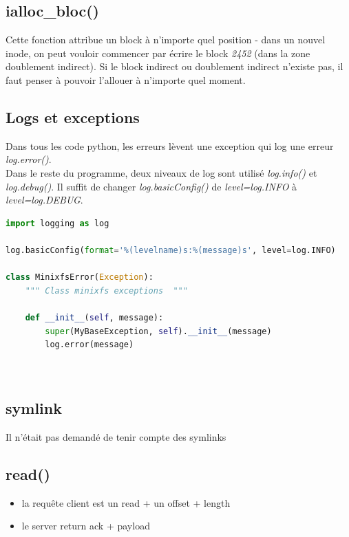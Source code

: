 \documentclass[a4paper,12pt]{article}
\begin{document}
\subsection{ialloc\_bloc()}

Cette fonction attribue un block à n'importe quel position - dans un nouvel inode, on peut vouloir commencer par écrire le block \emph{2452} (dans la zone doublement indirect). Si le block indirect ou doublement indirect n'existe pas, il faut penser à pouvoir l'allouer à n'importe quel moment.\\

\subsection{Logs et exceptions}

Dans tous les code python, les erreurs lèvent une exception qui log une erreur \emph{log.error()}.\\

Dans le reste du programme, deux niveaux de log sont utilisé \emph{log.info()} et \emph{log.debug()}. Il suffit de changer \emph{log.basicConfig()} de \emph{level=log.INFO} à  \emph{level=log.DEBUG}.\\

\begin{lstlisting}[language=python, caption=initialisation logs et exception MinixfsError()]
import logging as log

log.basicConfig(format='%(levelname)s:%(message)s', level=log.INFO)

class MinixfsError(Exception):
    """ Class minixfs exceptions  """

    def __init__(self, message):
        super(MyBaseException, self).__init__(message)
        log.error(message)
        
        
\end{lstlisting}

\subsection{symlink}

Il n'était pas demandé de tenir compte des symlinks 



\subsection*{read()}

\begin{itemize}
\item la requête client est un read + un offset + length
\item le server return ack + payload
\end{itemize}
\end{document}
